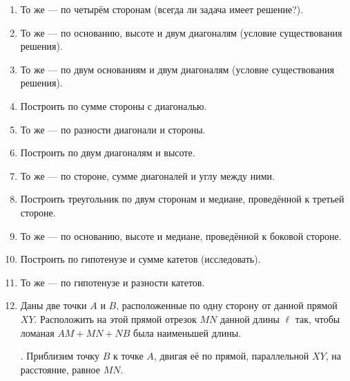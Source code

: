 {\begin{enumerate}
\item
То же — по четырём сторонам (всегда ли задача имеет решение?).

\item
То же — по основанию, высоте и двум диагоналям (условие существования решения).

\item
То же — по двум основаниям и двум диагоналям (условие существования решения).

\item
Построить  по сумме стороны с диагональю.

\item
То же — по разности диагонали и стороны.

\item
Построить  по двум диагоналям и высоте.

\item
То же — по стороне, сумме диагоналей и углу между ними.

\item
Построить треугольник по двум сторонам и медиане, проведённой к третьей стороне.

\item
То же — по основанию, высоте и медиане, проведённой к боковой стороне.

\item
Построить  по гипотенузе и сумме катетов (исследовать).

\item
То же — по гипотенузе и разности катетов.

\item
Даны две точки $A$ и $B$, расположенные по одну сторону от данной прямой $XY$.
Расположить на этой прямой отрезок $MN$ данной длины $\ell$ так, чтобы ломаная $AM+MN+NB$ была наименьшей длины.

\smallskip
{}.
Приблизим точку $B$ к точке $A$, двигая её по прямой, параллельной $XY$, на расстояние, равное $MN$.

\end{enumerate}

}
